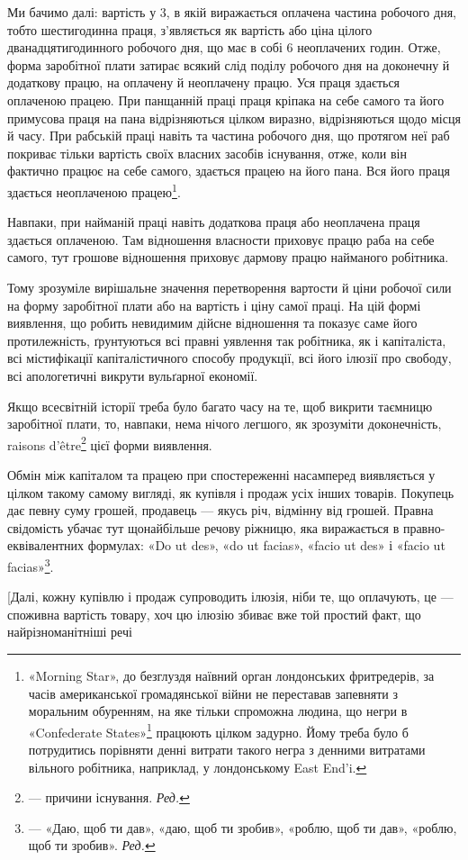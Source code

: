 Ми бачимо далі: вартість у 3, в якій виражається
оплачена частина робочого дня, тобто шестигодинна праця,
з’являється як вартість або ціна цілого дванадцятигодинного
робочого дня, що має в собі 6 неоплачених годин. Отже, форма
заробітної плати затирає всякий слід поділу робочого дня на
доконечну й додаткову працю, на оплачену й неоплачену працю.
Уся праця здається оплаченою працею. При панщанній праці
праця кріпака на себе самого та його примусова праця на пана
відрізняються цілком виразно, відрізняються щодо місця й часу.
При рабській праці навіть та частина робочого дня, що протягом
неї раб покриває тільки вартість своїх власних засобів існування,
отже, коли він фактично працює на себе самого, здається працею
на його пана. Вся його праця здається неоплаченою працею\footnote{
«Morning Star», до безглуздя наївний орган лондонських фритредерів,
за часів американської громадянської війни не переставав запевняти
з моральним обуренням, на яке тільки спроможна людина, що
негри в «Confederate States»\footnote*{
— південних штатах. \emph{Ред.}
} працюють цілком задурно. Йому треба
було б потрудитись порівняти денні витрати такого негра з денними витратами
вільного робітника, наприклад, у лондонському East End'i.
}.

Навпаки, при найманій праці навіть додаткова праця або
неоплачена праця здається оплаченою. Там відношення власности
приховує працю раба на себе самого, тут грошове відношення
приховує дармову працю найманого робітника.

Тому зрозуміле вирішальне значення перетворення вартости
й ціни робочої сили на форму заробітної плати або на вартість
і ціну самої праці. На цій формі виявлення, що робить невидимим
дійсне відношення та показує саме його протилежність,
ґрунтуються всі правні уявлення так робітника, як і капіталіста,
всі містифікації капіталістичного способу продукції, всі
його ілюзії про свободу, всі апологетичні викрути вульґарної
економії.

Якщо всесвітній історії треба було багато часу на те, щоб
викрити таємницю заробітної плати, то, навпаки, нема нічого
легшого, як зрозуміти доконечність, raisons d’être\footnote*{
— причини існування. \emph{Ред.}
} цієї форми виявлення.

Обмін між капіталом та працею при спостереженні насамперед
виявляється у цілком такому самому вигляді, як купівля
і продаж усіх інших товарів. Покупець дає певну суму грошей,
продавець — якусь річ, відмінну від грошей. Правна свідомість
убачає тут щонайбільше речову ріжницю, яка виражається
в правно-еквівалентних формулах: «Do ut des», «do ut facias»,
«facio ut des» і «facio ut facias»\footnote*{
— «Даю, щоб ти дав», «даю, щоб ти зробив», «роблю, щоб ти дав»,
«роблю, щоб ти зробив». \emph{Ред.}
}.

[Далі, кожну купівлю і продаж супроводить ілюзія, ніби
те, що оплачують, це — споживна вартість товару, хоч цю ілюзію
збиває вже той простий факт, що найрізноманітніші речі
\parbreak{}  %
